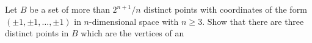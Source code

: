 Let $B$ be a set of more than $2^{n+1}/n$ distinct points with
coordinates
of the form $(\pm 1,\pm 1,\ldots,\pm 1)$ in $n$-dimensional space with
$n\geq 3$.
Show that there are three distinct points in $B$ which are the vertices of
an
